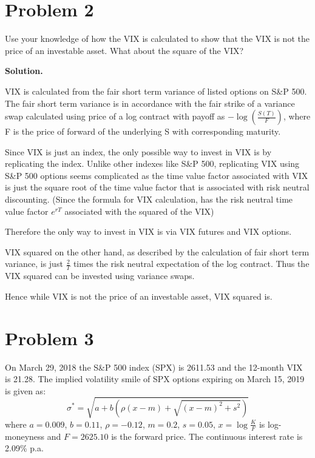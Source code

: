 \documentclass[12pt]{article}
\newenvironment{solution}{\vspace{0.2cm} \textbf{Solution.}}{}
\begin{document}
\newpage

	\section*{Problem 2}
Use your knowledge of how the VIX is calculated to show that the VIX is not the price of an investable asset. What about the square of the VIX?

\begin{solution}

VIX is calculated from the fair short term variance of listed options on S\&P 500. The fair short term variance is in accordance with the fair strike of a variance swap calculated using price of a log contract with payoff as $-\log (\frac{S(T)}{F})$, where F is the price of forward of the underlying S with corresponding maturity. 

Since VIX is just an index, the only possible way to invest in VIX is by replicating the index. Unlike other indexes like S\&P 500, replicating VIX using S\&P 500 options seems complicated as the time value factor associated with VIX is just the square root of the time value factor that is associated with risk neutral discounting. (Since the formula for VIX calculation, has the risk neutral time value factor $e^{rT}$ associated with the squared of the VIX)

Therefore the only way to invest in VIX is via VIX futures and VIX options.

VIX squared on the other hand, as described by the calculation of fair short term variance, is just $\frac{2}{T}$ times the risk neutral expectation of the log contract. Thus the VIX squared can be invested using variance swaps.

Hence while VIX is not the price of an investable asset, VIX squared is. 

\end{solution}

\newpage
	
	\section*{Problem 3}
On March 29, 2018 the S\&P 500 index (SPX) is 2611.53 and the 12-month VIX is 21.28. The implied volatility smile of SPX options expiring on March 15, 2019 is given as:
$$ \sigma^* = \sqrt{a + b \left( \rho (x - m)  + \sqrt{(x-m)^2 + s^2} \right)} $$
where $a = 0.009$, $b = 0.11$, $\rho = −0.12$, $m = 0.2$, $s = 0.05$, $x = \log \frac{K}{F}$ is log-moneyness and $F = 2625.10$ is the forward price. The continuous interest rate is 2.09\% p.a.
\end{document}
